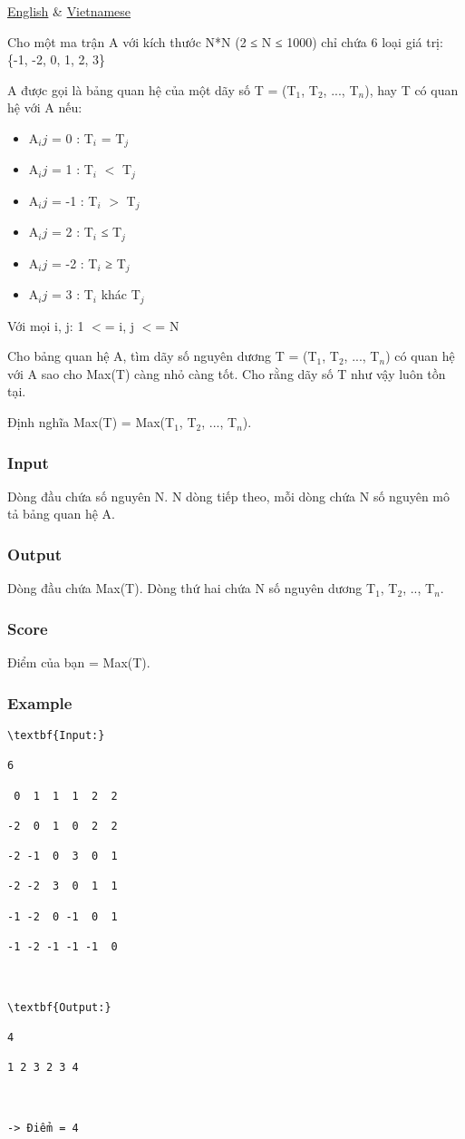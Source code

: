 
\begin{tabular}\href{/problems/RELBOARD/en/}{English} & \href{/problems/RELBOARD/vn/}{Vietnamese}
\end{tabular}

Cho một ma trận A với kích thước N*N (2 ≤ N ≤ 1000) chỉ chứa 6 loại giá trị:  \{-1, -2, 0, 1, 2, 3\}

A được gọi là bảng quan hệ của một dãy số T = (T$_1$, T$_2$, ..., T$_n$), hay T có quan hệ với A nếu:
\begin{itemize}
	\item A$_ij$ = 0  : T$_i$ = T$_j$
	\item A$_ij$ = 1  : T$_i$ $<$ T$_j$
	\item A$_ij$ = -1 : T$_i$ $>$ T$_j$
	\item A$_ij$ = 2  : T$_i$ ≤ T$_j$
	\item A$_ij$ = -2 : T$_i$ ≥ T$_j$
	\item A$_ij$ = 3  : T$_i$ khác T$_j$
\end{itemize}

Với mọi i, j: 1 $<$= i, j $<$= N

Cho bảng quan hệ A, tìm dãy số nguyên dương T = (T$_1$, T$_2$, ..., T$_n$) có quan hệ với A sao cho Max(T) càng nhỏ càng tốt. Cho rằng dãy số T như vậy luôn tồn tại. 

Định nghĩa Max(T) = Max(T$_1$, T$_2$, ..., T$_n$).

\subsubsection{Input}

Dòng đầu chứa số nguyên N. N dòng tiếp theo, mỗi dòng chứa N số nguyên mô tả bảng quan hệ A. 

 

\subsubsection{Output}

Dòng đầu chứa Max(T). Dòng thứ hai chứa N số nguyên dương T$_1$, T$_2$, .., T$_n$. 

\subsubsection{Score}

 Điểm của bạn = Max(T).

 

 

\subsubsection{Example}
\begin{verbatim}
\textbf{Input:}

6

 0  1  1  1  2  2

-2  0  1  0  2  2

-2 -1  0  3  0  1

-2 -2  3  0  1  1

-1 -2  0 -1  0  1

-1 -2 -1 -1 -1  0



\textbf{Output:}

4

1 2 3 2 3 4 



-> Điểm = 4

\end{verbatim}
